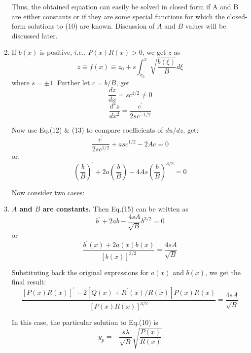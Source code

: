 \documentclass{article}
\begin{document}
\begin{enumerate}
Thus, the obtained equation can easily be solved in
closed form if A and B are either constants or if they are some special functions for which the closed-form solutions to (10) are known. Discussion of $A$ and $B$ values will be discussed later.

\item If $b(x)$ is positive, $i.e.$, $P(x)R(x)>0$, we get
$z$ as
\begin{equation}
z \equiv f(x) \equiv z _ { 0 } + s \int _ { x _ { 0 } } ^ { x } \sqrt { \frac { b ( \xi ) } { B } } d \xi
\end{equation}
where $s = \pm 1$. Further let $c=b/B$, get
\begin{equation}
\frac { d z } { d x } = s c ^ { 1 / 2 } \neq 0	
\end{equation}
\begin{equation}
\frac { d ^ { 2 } z } { d x ^ { 2 } } = \frac { c ^ { \prime } } { 2 s c ^ { - 1 / 2 } }
\end{equation}

Now use Eq.(12) \& (13) to compare coefficients of $du/dz$, get:
\begin{equation}
\frac { c ^ { \prime } } { 2 s c ^ { 1 / 2 } } + a s c ^ { 1 / 2 } - 2 A c = 0
\end{equation}
or,
\begin{equation}
\left( \frac { b } { B } \right) ^ { \prime } + 2 a \left( \frac { b } { B } \right) - 4 A s \left( \frac { b } { B } \right) ^ { 3 / 2 } = 0
\end{equation}

Now consider two cases:

\item \textbf{$A$ and $B$ are constants.} Then Eq.(15) can be written as 
$$b ^ { \prime } + 2 a b - \frac { 4 s A } { \sqrt { B } } b ^ { 3 / 2 } = 0$$
or
\begin{equation}
\frac { b ^ { \prime } ( x ) + 2 a ( x ) b ( x ) } { [ b ( x ) ] ^ { 3 / 2 } } = \frac { 4 s A } { \sqrt { B } }
\end{equation}

Substituting back the original expressions for $a(x)$ and $b(x)$, we get the final result:
\begin{equation}
\frac { [ P ( x ) R ( x ) ] ^ { \prime } - 2 \left[ Q ( x ) + R ^ { \prime } ( x ) / R ( x ) \right] P ( x ) R ( x ) } { [ P ( x ) R ( x ) ] ^ { 3 / 2 } } = \frac { 4 s A } { \sqrt { B } }
\end{equation}

In this case, the particular solution to Eq.(10) is
\begin{equation}
y _ { p } = - \frac { s \lambda } { \sqrt { B } } \sqrt { \frac { P ( x ) } { R ( x ) } }
\end{equation}


\end{enumerate}
\end{document}
